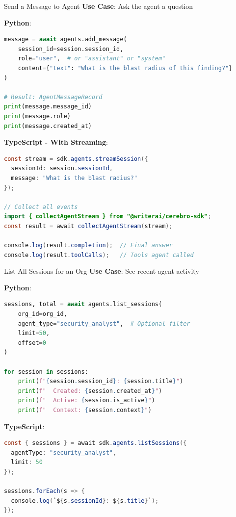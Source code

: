 \documentclass[aspectratio=169]{beamer}
\begin{document}
\begin{frame}[fragile]{Send a Message to Agent}
\textbf{Use Case}: Ask the agent a question

\textbf{Python}:
\begin{lstlisting}[language=Python]
message = await agents.add_message(
    session_id=session.session_id,
    role="user",  # or "assistant" or "system"
    content={"text": "What is the blast radius of this finding?"}
)

# Result: AgentMessageRecord
print(message.message_id)
print(message.role)
print(message.created_at)
\end{lstlisting}

\textbf{TypeScript - With Streaming}:
\begin{lstlisting}[language=Java]
const stream = sdk.agents.streamSession({
  sessionId: session.sessionId,
  message: "What is the blast radius?"
});

// Collect all events
import { collectAgentStream } from "@writerai/cerebro-sdk";
const result = await collectAgentStream(stream);

console.log(result.completion);  // Final answer
console.log(result.toolCalls);   // Tools agent called
\end{lstlisting}
\end{frame}

\begin{frame}[fragile]{List All Sessions for an Org}
\textbf{Use Case}: See recent agent activity

\textbf{Python}:
\begin{lstlisting}[language=Python]
sessions, total = await agents.list_sessions(
    org_id=org_id,
    agent_type="security_analyst",  # Optional filter
    limit=50,
    offset=0
)

for session in sessions:
    print(f"{session.session_id}: {session.title}")
    print(f"  Created: {session.created_at}")
    print(f"  Active: {session.is_active}")
    print(f"  Context: {session.context}")
\end{lstlisting}

\textbf{TypeScript}:
\begin{lstlisting}[language=Java]
const { sessions } = await sdk.agents.listSessions({
  agentType: "security_analyst",
  limit: 50
});

sessions.forEach(s => {
  console.log(`${s.sessionId}: ${s.title}`);
});
\end{lstlisting}
\end{frame}
\end{document}
